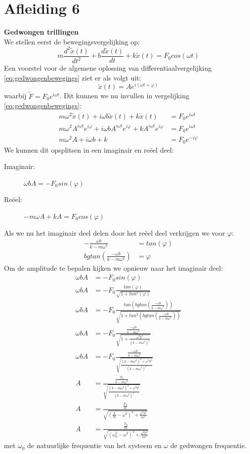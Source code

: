 \documentclass[a4paper,kul]{kulakarticle} %
\begin{document}
\newpage
\section{Afleiding 6}
\textbf{Gedwongen trillingen}\\
We stellen eerst de bewegingsvergelijking op:
\begin{equation}
	m\frac{d^2\widetilde{x}(t)}{dt^2}+b\frac{d\widetilde{x}(t)}{dt}+k\widetilde{x}(t) = F_0cos(\omega t)
	\label{eq:gedwongenbewegings}
\end{equation}
Een voorstel voor de algemene oplossing van differentiaalvergelijking \ref{eq:gedwongenbewegings} ziet er als volgt uit:
\begin{equation*}
	\widetilde{x}(t) = Ae^{i(\omega t +\varphi)}
\end{equation*}
waarbij $\widetilde{F} = F_0e^{i\omega t}$.
Dit kunnen we nu invullen in vergelijking \ref{eq:gedwongenbewegings}:
\begin{align*}
	m\omega^2\widetilde{x}(t)+i\omega b\widetilde{x}(t)+k\widetilde{x}(t) & =F_0e^{i\omega t}\\
	m\omega^2A^{i\omega t}e^{i\varphi}+i\omega bA^{i\omega t}e^{i\varphi}+kA^{i\omega t}e^{i\varphi} & =F_0e^{i\omega t}\\
	m\omega^2A+i\omega b+k & =F_0e^{-i\varphi} 
\end{align*}
We kunnen dit opsplitsen in een imaginair en reëel deel:
\begin{description}
	\item[Imaginair:]$\omega bA = -F_0sin(\varphi)$
	\item[Reëel:] $-m\omega A +kA = F_0cos(\varphi)$
\end{description}
Als we nu het imaginair deel delen door het reëel deel verkrijgen we voor $\varphi$:
\begin{align*}
	-\frac{\omega b}{k-m\omega^2} &= tan(\varphi)\\
	bgtan(\frac{-\omega b}{k-m\omega^2}) & =\varphi
\end{align*}
Om de amplitude te bepalen kijken we opnieuw naar het imaginair deel:
\begin{align*}
	\omega bA &= -F_0sin(\varphi)\\
	\omega bA &= -F_0\frac{tan(\varphi)}{\sqrt{1+tan^2(\varphi)}}\\
	\omega bA &= -F_0\frac{tan(bgtan(\frac{-\omega b}{k-m\omega^2}))}{\sqrt{1+tan^2(bgtan(\frac{-\omega b}{k-m\omega^2}))}}\\
	\omega bA &= -F_0\frac{\frac{-\omega b}{k-m\omega^2}}{\sqrt{1+\frac{\omega^2 b^2}{(k-m\omega^2)^2}}}\\
	\omega bA &= -F_0\frac{\frac{-\omega b}{k-m\omega^2}}{\sqrt{\frac{(k-m\omega^2)^2+\omega^2 b^2}{(k-m\omega^2)^2}}}\\
	A &= \frac{\frac{F_0}{k-m\omega^2}}{\sqrt{\frac{(k-m\omega^2)^2+\omega^2 b^2}{(k-m\omega^2)^2}}}\\
	A &= \frac{\frac{F_0}{m}}{\sqrt{(\frac{k}{m}-\omega^2)^2+\frac{\omega^2b^2}{m^2}}}\\
	A &= \frac{\frac{F_0}{m}}{\sqrt{(\omega_0^2-\omega^2)^2+\frac{\omega^2b^2}{m^2}}}	
\end{align*}
met $\omega_0$ de natuurlijke frequentie van het systeem en $\omega$ de gedwongen frequentie.
\newpage
\end{document}
